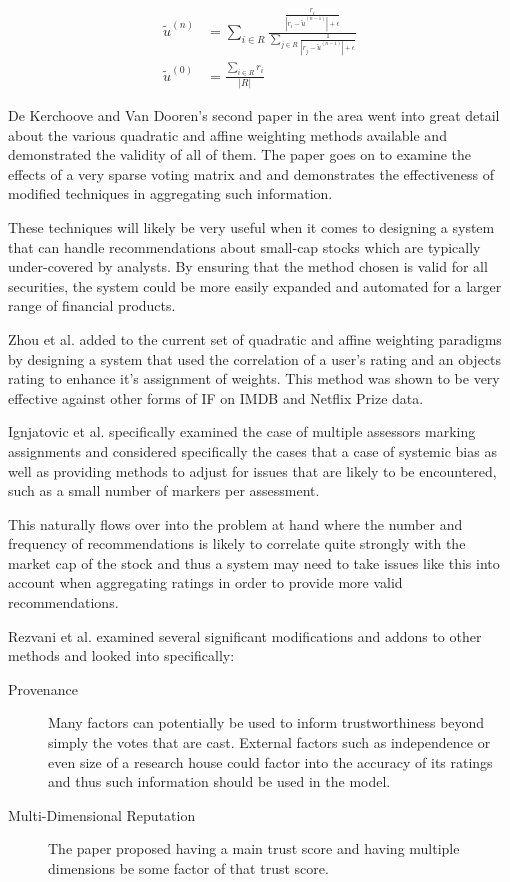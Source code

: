 \begin{align}
    \tilde{u}^{(n)} &= \sum\limits_{i \in R}\frac{\frac{r_i}{|r_i-\tilde{u}^{(n-1)}|+\epsilon}}{\sum\limits_{j\in R} \frac{1}{|r_j-\tilde{u}^{(n-1)}|+\epsilon}} \label{eq:affine} \\
    \tilde{u}^{(0)} &= \frac{\sum\limits_{i\in R} r_i}{|R|}\label{eq:affineBase}
\end{align}


De Kerchoove and Van Dooren's \cite{de2010iterative} second paper in the area went into great detail about the various quadratic and affine weighting methods available and demonstrated the validity of all of them. The paper goes on to examine the effects of a very sparse voting matrix and and demonstrates the effectiveness of modified techniques in aggregating such information.

These techniques will likely be very useful when it comes to designing a system that can handle recommendations about small-cap stocks which are typically under-covered by analysts. By ensuring that the method chosen is valid for all securities, the system could be more easily expanded and automated for a larger range of financial products.

Zhou et al. \cite{zhou2011robust} added to the current set of quadratic and affine weighting paradigms by designing a system that used the correlation of a user's rating and an objects rating to enhance it's assignment of weights. This method was shown to be very effective against other forms of IF on IMDB and Netflix Prize data.

Ignjatovic et al. \cite{ignjatovic2009computing} specifically examined the case of multiple assessors marking assignments and considered specifically the cases that a case of systemic bias as well as providing methods to adjust for issues that are likely to be encountered, such as a small number of markers per assessment.

This naturally flows over into the problem at hand where the number and frequency of recommendations is likely to correlate quite strongly with the market cap of the stock and thus a system may need to take issues like this into account when aggregating ratings in order to provide more valid recommendations.

Rezvani et al. \cite{rezvani2018provenance} examined several significant modifications and addons to other methods and looked into specifically:
\begin{description}
    \item[Provenance] Many factors can potentially be used to inform trustworthiness beyond simply the votes that are cast. External factors such as independence or even size of a research house could factor into the accuracy of its ratings and thus such information should be used in the model.
    \item[Multi-Dimensional Reputation] The paper proposed having a main trust score and having multiple dimensions be some factor of that trust score.
\end{description}